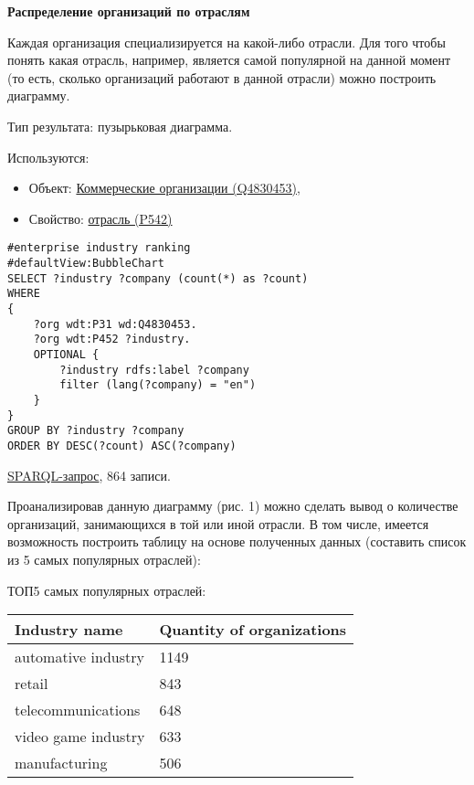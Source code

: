 \textbf{Распределение организаций по отраслям}

Каждая организация специализируется на какой-либо отрасли. Для того чтобы понять какая отрасль, например, является самой популярной на данной момент (то есть, сколько организаций работают в данной отрасли) можно построить диаграмму.

Тип результата: пузырьковая диаграмма. 

Используются:
\begin{itemize}
    \item Объект: \href{https://www.wikidata.org/wiki/Q4830453}{Коммерческие организации (Q4830453)},
    \item Свойство: \href{https://www.wikidata.org/wiki/Property:P452}{отрасль (P542)}
\end{itemize}

\begin{lstlisting}[language=SPARQL]
#enterprise industry ranking
#defaultView:BubbleChart
SELECT ?industry ?company (count(*) as ?count)
WHERE 
{
    ?org wdt:P31 wd:Q4830453.
    ?org wdt:P452 ?industry.
    OPTIONAL {
		?industry rdfs:label ?company
		filter (lang(?company) = "en")
	}
}
GROUP BY ?industry ?company
ORDER BY DESC(?count) ASC(?company)
\end{lstlisting}

\href{https://query.wikidata.org/#%23enterprise%20industry%20ranking%0A%23defaultView%3ABubbleChart%0ASELECT%20%3Findustry%20%3Fcompany%20%28count%28%2a%29%20as%20%3Fcount%29%0AWHERE%20%0A%7B%0A%20%20%20%20%3Forg%20wdt%3AP31%20wd%3AQ4830453.%0A%20%20%20%20%3Forg%20wdt%3AP452%20%3Findustry%20.%0A%20%20%20%20OPTIONAL%20%7B%0A%09%09%3Findustry%20rdfs%3Alabel%20%3Fcompany%0A%09%09filter%20%28lang%28%3Fcompany%29%20%3D%20%22en%22%29%0A%09%7D%0A%7D%0AGROUP%20BY%20%3Findustry%20%3Fcompany%0AORDER%20BY%20DESC%28%3Fcount%29%20ASC%28%3Fcompany%29%0A}{SPARQL-запрос}, 864 записи.

Проанализировав данную диаграмму (рис. 1) можно сделать вывод о количестве организаций, занимающихся в той или иной отрасли. В том числе, имеется возможность построить таблицу на основе полученных данных (составить список из 5 самых популярных отраслей):

ТОП5 самых популярных отраслей: \\
\begin{tabular}{|l|l|}
\hline
\textbf{Industry name} & \textbf{Quantity of organizations} \\
\hline
automative industry & 1149 \\	
\hline
retail & 843 \\
\hline
telecommunications & 648 \\
\hline
video game industry & 633 \\
\hline
manufacturing & 506 \\
\hline
\end{tabular}

